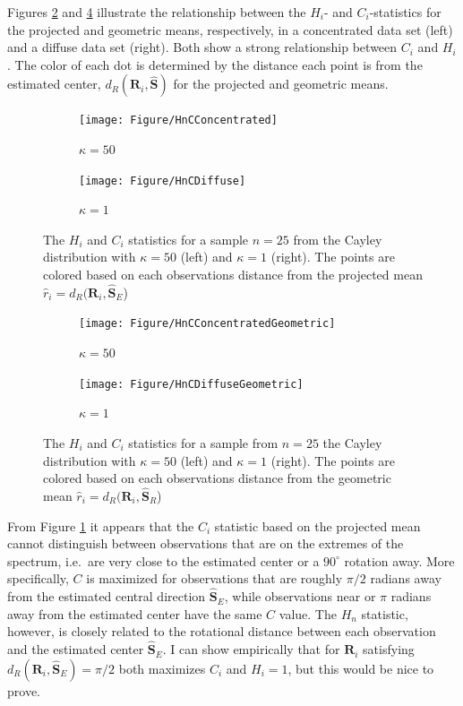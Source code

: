 \documentclass{article}\usepackage[]{graphicx}\usepackage[]{color}
\newcommand{\ProjMean}{{\widehat{\bm S}_{E}}}
\newcommand{\GeomMean}{{\widehat{\bm S}_{R}}}
\newcommand{\Sest}{{\widehat{\bm S}}}
\begin{document}
Figures \ref{fig:HnC} and \ref{fig:HnCGeom} illustrate the relationship between the $H_i$- and $C_i$-statistics for the projected and geometric means, respectively, in a concentrated data set (left) and a diffuse data set (right).  Both show a strong relationship between $C_i$ and $H_i$.  The color of each dot is determined by the distance each point is from the estimated center, $d_R(\bm R_i,\Sest)$ for the projected and geometric means.

\begin{figure}
\centering
\begin{subfigure}[b]{0.45\textwidth}
        \texttt{[image: Figure/HnCConcentrated]}
        \caption{$\kappa=50$}
\end{subfigure}
\begin{subfigure}[b]{0.45\textwidth}
        \texttt{[image: Figure/HnCDiffuse]}
        \caption{$\kappa=1$}
        \label{fig:HnDiff}
\end{subfigure}
\caption{The $H_i$ and $C_i$ statistics for a sample $n=25$ from the Cayley distribution with $\kappa=50$ (left) and $\kappa=1$ (right).  The points are colored based on each observations distance from the projected mean $\hat r_i=d_R(\bm R_i,\ProjMean$)}
\label{fig:HnC}
\end{figure}

\begin{figure}
\centering
\begin{subfigure}[b]{0.45\textwidth}
        \texttt{[image: Figure/HnCConcentratedGeometric]}
        \caption{$\kappa=50$}
\end{subfigure}
\begin{subfigure}[b]{0.45\textwidth}
        \texttt{[image: Figure/HnCDiffuseGeometric]}
        \caption{$\kappa=1$}
        \label{fig:HnDiffGeom}
\end{subfigure}
\caption{The $H_i$ and $C_i$ statistics for a sample from $n=25$ the Cayley distribution with $\kappa=50$ (left) and $\kappa=1$ (right).  The points are colored based on each observations distance from the geometric mean $\hat r_i=d_R(\bm R_i,\GeomMean$)}
\label{fig:HnCGeom}
\end{figure}

From Figure \ref{fig:HnDiff} it appears that the $C_i$ statistic based on the projected mean cannot distinguish between observations that are on the extremes of the spectrum, i.e.~are very close to the estimated center or a $90^\circ$ rotation away.  More specifically, $C$ is maximized for observations that are roughly $\pi/2$ radians away from the estimated central direction $\ProjMean$, while observations near or $\pi$ radians away from the estimated center have the same $C$ value.  %
The $H_n$ statistic, however, is closely related to the rotational distance between each observation and the estimated center $\ProjMean$.  I can show empirically that for $\bm R_i$ satisfying $d_R(\bm R_i,\ProjMean)=\pi/2$ both maximizes $C_i$ and $H_i=1$, but this would be nice to prove. 
\end{document}
